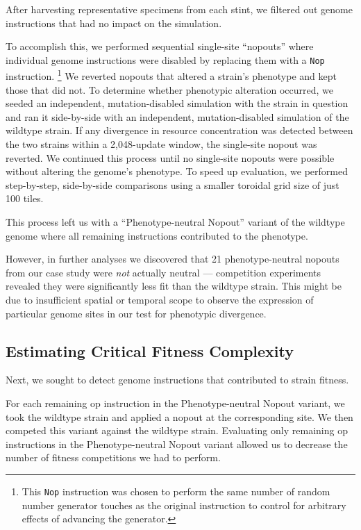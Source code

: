 After harvesting representative specimens from each stint, we filtered out genome instructions that had no impact on the simulation.

To accomplish this, we performed sequential single-site ``nopouts'' where individual genome instructions were disabled by replacing them with a \texttt{Nop} instruction.%
\footnote{
This \texttt{Nop} instruction was chosen to perform the same number of random number generator touches as the original instruction to control for arbitrary effects of advancing the generator.
}
We reverted nopouts that altered a strain's phenotype and kept those that did not.
To determine whether phenotypic alteration occurred, we seeded an independent, mutation-disabled simulation with the strain in question and ran it side-by-side with an independent, mutation-disabled simulation of the wildtype strain.
If any divergence in resource concentration was detected between the two strains within a 2,048-update window, the single-site nopout was reverted.
We continued this process until no single-site nopouts were possible without altering the genome's phenotype.
To speed up evaluation, we performed step-by-step, side-by-side comparisons using a smaller toroidal grid size of just 100 tiles.

This process left us with a ``Phenotype-neutral Nopout'' variant of the wildtype genome where all remaining instructions contributed to the phenotype.

However, in further analyses we discovered that 21 phenotype-neutral nopouts from our case study were \textit{not} actually neutral --- competition experiments revealed they were significantly less fit than the wildtype strain.
This might be due to insufficient spatial or temporal scope to observe the expression of particular genome sites in our test for phenotypic divergence.

\subsection{Estimating Critical Fitness Complexity}

Next, we sought to detect genome instructions that contributed to strain fitness.

For each remaining op instruction in the Phenotype-neutral Nopout variant, we took the wildtype strain and applied a nopout at the corresponding site.
We then competed this variant against the wildtype strain.
Evaluating only remaining op instructions in the Phenotype-neutral Nopout variant allowed us to decrease the number of fitness competitions we had to perform.

